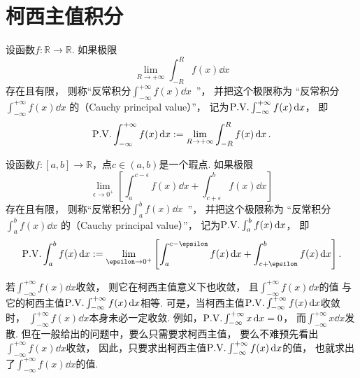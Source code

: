 \section{柯西主值积分}
\begin{definition}
设函数\(f\colon\mathbb{R}\to\mathbb{R}\).
如果极限\[
	\lim_{R\to+\infty} \int_{-R}^R f(x) \dd{x}
\]存在且有限，
则称“反常积分\(\int_{-\infty}^{+\infty} f(x) \dd{x}\)~”，
并把这个极限称为
“反常积分\(\int_{-\infty}^{+\infty} f(x) \dd{x}\)
的（Cauchy principal value）”，
记为\(\pvint_{-\infty}^{+\infty} f(x) \dd{x}\)，
即\[
	\pvint_{-\infty}^{+\infty} f(x) \dd{x}
	\defeq \lim_{R\to+\infty} \int_{-R}^R f(x) \dd{x}.
\]
\end{definition}

\begin{definition}
设函数\(f\colon[a,b]\to\mathbb{R}\)，点\(c\in(a,b)\)是一个瑕点.
如果极限\[
	\lim_{\epsilon\to0^+} \left[
		\int_a^{c-\epsilon} f(x) \dd{x}
		+ \int_{c+\epsilon}^b f(x) \dd{x}
	\right]
\]存在且有限，
则称“反常积分\(\int_a^b f(x) \dd{x}\)~”，
并把这个极限称为
“反常积分\(\int_a^b f(x) \dd{x}\)
的（Cauchy principal value）”，
记为\(\pvint_a^b f(x) \dd{x}\)，
即\[
	\pvint_a^b f(x) \dd{x}
	\defeq \lim_{\epsilon\to0^+} \left[
		\int_a^{c-\epsilon} f(x) \dd{x}
		+ \int_{c+\epsilon}^b f(x) \dd{x}
	\right].
\]
\end{definition}

若\(\int_{-\infty}^{+\infty} f(x) \dd{x}\)收敛，
则它在柯西主值意义下也收敛，
且\(\int_{-\infty}^{+\infty} f(x) \dd{x}\)的值
与它的柯西主值\(\pvint_{-\infty}^{+\infty} f(x) \dd{x}\)相等.
可是，当柯西主值\(\pvint_{-\infty}^{+\infty} f(x) \dd{x}\)收敛时，
\(\int_{-\infty}^{+\infty} f(x) \dd{x}\)本身未必一定收敛.
例如，\(\pvint_{-\infty}^{+\infty} x \dd{x} = 0\)，
而\(\int_{-\infty}^{+\infty} x \dd{x}\)发散.
但在一般给出的问题中，要么只需要求柯西主值，
要么不难预先看出\(\int_{-\infty}^{+\infty} f(x) \dd{x}\)收敛，
因此，只要求出柯西主值\(\pvint_{-\infty}^{+\infty} f(x) \dd{x}\)的值，
也就求出了\(\int_{-\infty}^{+\infty} f(x) \dd{x}\)的值.

